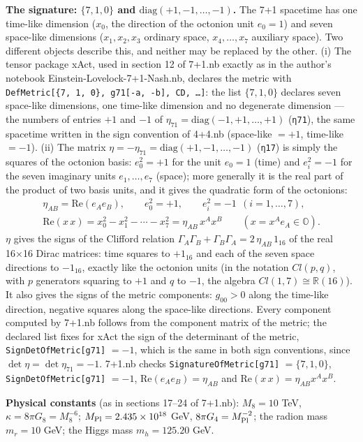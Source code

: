 \documentclass[10pt,a4paper]{article}
\begin{document}
\textbf{The signature: $\{7,1,0\}$ and $\mathrm{diag}(+1,-1,\dots,-1)$.} The 7+1 spacetime has one time-like dimension ($x_0$, the direction of the octonion unit $e_0=1$) and seven space-like dimensions ($x_1,x_2,x_3$ ordinary space, $x_4,\dots,x_7$ auxiliary space). Two different objects describe this, and neither may be replaced by the other. (i) The tensor package xAct, used in section 12 of 7+1.nb exactly as in the author’s notebook Einstein-Lovelock-7+1-Nash.nb, declares the metric with \texttt{DefMetric[\{7, 1, 0\}, g71[-a, -b], CD, …]}: the list $\{7,1,0\}$ declares seven space-like dimensions, one time-like dimension and no degenerate dimension — the numbers of entries $+1$ and $-1$ of $\eta_{71}=\mathrm{diag}(-1,+1,\dots,+1)$ (\texttt{η71}), the same spacetime written in the sign convention of 4+4.nb (space-like $=+1$, time-like $=-1$). (ii) The matrix $\eta=-\eta_{71}=\mathrm{diag}(+1,-1,\dots,-1)$ (\texttt{η17}) is simply the squares of the octonion basis: $e_0^2=+1$ for the unit $e_0=1$ (time) and $e_i^2=-1$ for the seven imaginary units $e_1,\dots,e_7$ (space); more generally it is the real part of the product of two basis units, and it gives the quadratic form of the octonions:
\begin{gather*}
\eta_{AB}=\mathrm{Re}(e_Ae_B),\qquad e_0^2=+1,\qquad e_i^2=-1\ \ (i=1,\dots,7),\\ \mathrm{Re}(x\,x)=x_0^2-x_1^2-\cdots-x_7^2=\eta_{AB}\,x^Ax^B\qquad (x=x^Ae_A\in\mathbb O).
\end{gather*}
$\eta$ gives the signs of the Clifford relation $\Gamma_A\Gamma_B+\Gamma_B\Gamma_A=2\,\eta_{AB}\,1_{16}$ of the real 16×16 Dirac matrices: time squares to $+1_{16}$ and each of the seven space directions to $-1_{16}$, exactly like the octonion units (in the notation $Cl(p,q)$, with $p$ generators squaring to $+1$ and $q$ to $-1$, the algebra $Cl(1,7)\cong\mathbb R(16)$). It also gives the signs of the metric components: $g_{00}>0$ along the time-like direction, negative squares along the space-like directions. Every component computed by 7+1.nb follows from the component matrix of the metric; the declared list fixes for xAct the sign of the determinant of the metric, \texttt{SignDetOfMetric[g71]} $=-1$, which is the same in both sign conventions, since $\det \eta=\det \eta_{71}=-1$. 7+1.nb checks \texttt{SignatureOfMetric[g71]} $=\{7,1,0\}$, \texttt{SignDetOfMetric[g71]} $=-1$, $\mathrm{Re}(e_Ae_B)=\eta_{AB}$ and $\mathrm{Re}(x\,x)=\eta_{AB}x^Ax^B$.

\textbf{Physical constants} (as in sections 17–24 of 7+1.nb): $M_8=10$ TeV, $\kappa=8\pi G_8=M_8^{-6}$; $M_{\rm Pl}=2.435\times10^{18}$ GeV, $8\pi G_4=M_{\rm Pl}^{-2}$; the radion mass $m_r=10$ GeV; the Higgs mass $m_h=125.20$ GeV.
\end{document}
